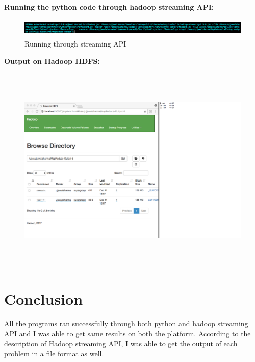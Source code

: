 \documentclass[a4paper, 10pt]{article}
\begin{document}
\noindent
\textbf{Running the python code through hadoop streaming API:}
\begin{figure}[!htbp]
    \centering
    \includegraphics[height=0.90cm]{Run5.png}
    \caption{Running through streaming API}
\end{figure}

\newpage
\noindent
\textbf{Output on Hadoop HDFS:}
\begin{figure}[!htbp]
    \centering
    \includegraphics[height=10cm]{Hadoop5.png}
\end{figure}

\section{Conclusion}

All the programs ran successfully through both python and hadoop streaming API and I was able to get same results on both the platform. According to the description of Hadoop streaming API, I was able to get the output of each problem in a file format as well.
\end{document}
